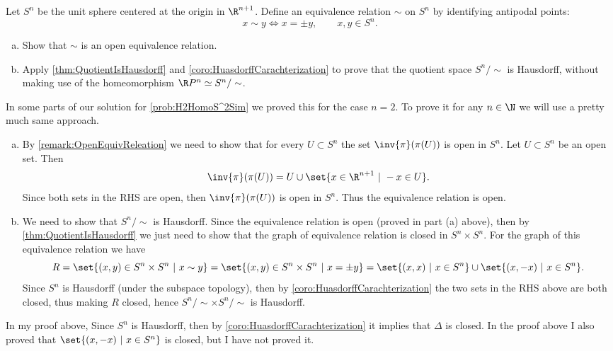 \begin{problem}
	Let $ S^n $ be the unit sphere centered at the origin in $ \R^{n+1} $. Define an equivalence relation $ \sim $ on $ S^n $ by identifying antipodal points:
	\[ x\sim y \Longleftrightarrow x = \pm y, \qquad x,y \in S^n. \]
	\begin{enumerate}[(a)]
		\item Show that $ \sim $ is an open equivalence relation.
		\item Apply \autoref{thm:QuotientIsHausdorff} and \autoref{coro:HuasdorffCarachterization} to prove that the quotient space $ S^n/\sim $ is Hausdorff, without making use of the homeomorphism $ \R P^n \simeq S^n/\sim $.
	\end{enumerate}
\end{problem}
\begin{solution}
	In some parts of our solution for \autoref{prob:H2HomoS^2Sim} we proved this for the case $ n=2 $. To prove it for any $ n \in  \N $ we will use a pretty much same approach.
	\begin{enumerate}[(a)]
		\item By \autoref{remark:OpenEquivReleation} we need to show that for every $ U \subset S^n $ the set $ \inv{\pi}(\pi(U)) $ is open in $ S^n $. Let $ U \subset S^n $ be an open set. Then 
		\[ \inv{\pi}(\pi(U)) = U \cup \set{x \in \R^{n+1}\ |\ -x \in U}. \]
		Since both sets in the RHS are open, then $ \inv{\pi}(\pi(U)) $ is open in $ S^n $. Thus the equivalence relation is open. 
		
		\item We need to show that $ S^n/\sim $ is Hausdorff. Since the equivalence relation is open (proved in part (a) above), then by \autoref{thm:QuotientIsHausdorff} we just need to show that the graph of equivalence relation is closed in $ S^n \times S^n $. For the graph of this equivalence relation we have
		\[ R = \set{(x,y) \in S^n \times S^n\ |\ x \sim y} = \set{(x,y) \in S^n \times S^n\ |\ x = \pm y} = \set{(x,x) \ |\ x \in S^n} \cup \set{(x,-x) \ |\ x \in S^n}. \]
		Since $ S^n $ is Hausdorff (under the subspace topology), then by \autoref{coro:HuasdorffCarachterization} the two sets in the RHS above are both closed, thus making $ R $ closed, hence $ S^n/\sim \times S^n/\sim $ is Hausdorff.
	\end{enumerate}
	\begin{carefull}
		In my proof above, Since $ S^n $ is Hausdorff, then by \autoref{coro:HuasdorffCarachterization} it implies that $ \Delta $ is closed. In the proof above I also proved that $ \set{(x,-x)\ |\ x \in S^n} $ is closed, but I have not proved it.
	\end{carefull}
\end{solution}


